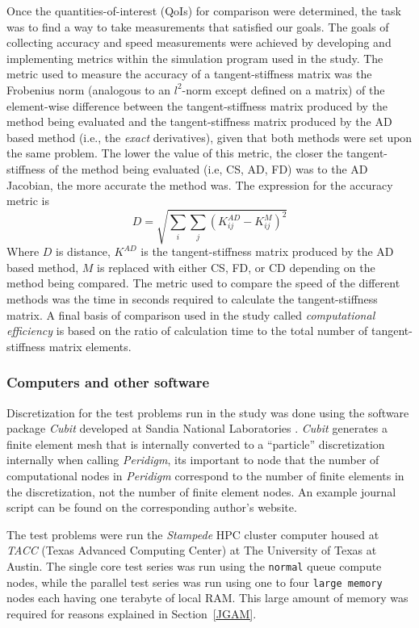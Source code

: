 \documentclass[preprint,12pt]{elsarticle}
\begin{document}
Once the quantities-of-interest (QoIs) for comparison were determined, the task was to find a way to take measurements that satisfied our goals. The goals of collecting accuracy and speed measurements were achieved by developing and implementing metrics within the simulation program used in the study. The metric used to measure the accuracy of a tangent-stiffness matrix was the Frobenius norm (analogous to an $l^2$-norm except defined on a matrix) of the element-wise difference between the tangent-stiffness matrix produced by the method being evaluated and the tangent-stiffness matrix produced by the AD based method (i.e., the \emph{exact} derivatives), given that both methods were set upon the same problem. The lower the value of this metric, the closer the tangent-stiffness of the method being evaluated (i.e, CS, AD, FD)  was to the AD Jacobian, the more accurate the method was. The expression for the accuracy metric is
%
\begin{equation} 
  D = \sqrt{\sum_i \sum_j(K^{AD}_{ij} - K^{M}_{ij})^2}
\end{equation}
%
Where $D$ is distance, $K^{AD}$ is the tangent-stiffness matrix produced by the AD based method, $M$ is replaced with either CS, FD, or CD depending on the method being compared.  The metric used to compare the speed of the different methods was the time in seconds required to calculate the tangent-stiffness matrix. A final basis of comparison used in the study called \emph{computational efficiency} is based on the ratio of calculation time to the total number of tangent-stiffness matrix elements.

\subsubsection{Computers and other software} 
%
Discretization for the test problems run in the study was done using the software package \emph{Cubit} developed at Sandia National Laboratories \cite{ref-Cubit}. \emph{Cubit} generates a finite element mesh that is internally converted to a ``particle'' discretization internally when calling \emph{Peridigm}, its important to node that the number of computational nodes in \emph{Peridigm} correspond to the number of finite elements in the discretization, not the number of finite element nodes.  An example journal script can be found on the corresponding author's website. 

The test problems were run the \emph{Stampede} HPC cluster computer housed at \emph{TACC} (Texas Advanced Computing Center) at The University of Texas at Austin. The single core test series was run using the {\tt normal} queue compute nodes, while the parallel test series was run using one to four {\tt large memory} nodes each having one terabyte of local RAM. This large amount of memory was required for reasons explained in Section~\ref{JGAM}.  
\end{document}
